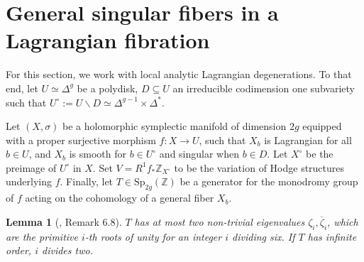 \documentclass[12pt]{amsart}
\newcommand{\Z}{\mathbb{Z}}
\newcommand{\Sp}{\mathrm{Sp}}
\newcommand{\ol}{\overline}
\newtheorem{lemma}[theorem]{Lemma}
\theoremstyle{definition}
\numberwithin{equation}{section}
\begin{document}
\section{General singular fibers in a Lagrangian fibration}

For this section, we work with local analytic Lagrangian degenerations. To that end, 
let \(U \simeq \Delta^g\) be a polydisk, \(D \subseteq U\) an irreducible codimension 
one subvariety such that 
\(U^\circ := U \smallsetminus D \simeq \Delta^{g-1} \times \Delta^*\).

Let \((X, \sigma)\) be a holomorphic symplectic manifold of dimension \(2g\) equipped 
with a proper surjective morphism \(f: X \to U\), such that 
\(X_b\) is Lagrangian for all \(b \in U\), and \(X_b\) is smooth for \(b \in U^\circ\)
and singular when \(b \in D\). Let \(X^\circ\) be the preimage of \(U^\circ\) in \(X\). 
Set \(V = R^1 f_* \Z_{X^\circ}\) to be the variation of Hodge structures underlying \(f\).
Finally, let \(T \in \Sp_{2g}(\Z)\) be a generator for the monodromy group of \(f\) 
acting on the cohomology of a general fiber \(X_b\).



\begin{lemma}[\cite{bakker-schnell23}, Remark 6.8] \label{local-monodromy-eigenvalues}
    \(T\) has at most two non-trivial eigenvalues \(\zeta_i, \ol{\zeta}_i\), which 
    are the primitive \(i\)-th roots of unity for an integer \(i\) dividing six.
    If \(T\) has infinite order, \(i\) divides two.
\end{lemma}
\end{document}
